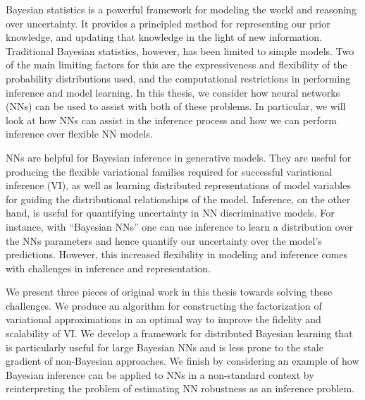 \vspace{20pt}
Bayesian statistics is a powerful framework for modeling the world and reasoning over uncertainty. It provides a principled method for representing our prior knowledge, and updating that knowledge in the light of new information. Traditional Bayesian statistics, however, has been limited to simple models. Two of the main limiting factors for this are the expressiveness and flexibility of the probability distributions used, and the computational restrictions in performing inference and model learning. In this thesis, we consider how neural networks (NNs) can be used to assist with both of these problems. In particular, we will look at how NNs can assist in the inference process and how we can perform inference over flexible NN models.

NNs are helpful for Bayesian inference in generative models. They are useful for producing the flexible variational families required for successful variational inference (VI), as well as learning distributed representations of model variables for guiding the distributional relationships of the model. Inference, on the other hand, is useful for quantifying uncertainty in NN discriminative models. For instance, with ``Bayesian NNs'' one can use inference to learn a distribution over the NNs parameters and hence quantify our uncertainty over the model's predictions. However, this increased flexibility in modeling and inference comes with challenges in inference and representation.

We present three pieces of original work in this thesis towards solving these challenges. We produce an algorithm for constructing the factorization of variational approximations in an optimal way to improve the fidelity and scalability of VI. We develop a framework for distributed Bayesian learning that is particularly useful for large Bayesian NNs and is less prone to the stale gradient of non-Bayesian approaches. We finish by considering an example of how Bayesian inference can be applied to NNs in a non-standard context by reinterpreting the problem of estimating NN robustness as an inference problem.